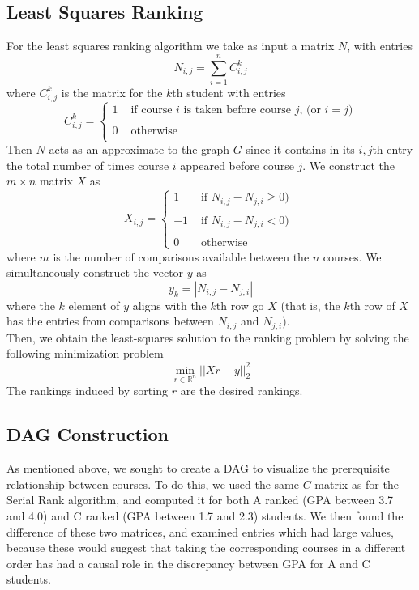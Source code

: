 \documentclass[10pt]{siamltex}
\begin{document}
\begin{pagewiselinenumbers}
\subsection{Least Squares Ranking}
For the least squares ranking algorithm we take as input a matrix $N$, with entries $$N_{i, j} = \sum_{i = 1}^n C^k_{i, j}$$
where $C^k_{i, j}$ is the matrix for the $k$th student with entries
\begin{equation}
C^k_{i,j} = \left\{
	\begin{array}{rl}
 1 & \text{ if course $i$ is taken before course $j$, (or $i=j$)} 	\\
 &  \\
 0 & \text{ otherwise }	\\
     \end{array}
   \right.
\label{comparisonMatrix}
\end{equation}
Then $N$ acts as an approximate to the graph $G$ since it contains in its $i, j$th entry the total number of times course $i$ appeared before course $j$. We construct the $m \times n$ matrix $X$ as
\begin{equation}
X_{i,j} = \left\{
	\begin{array}{rl}
 1 & \text{ if $N_{i, j} - N_{j, i} \geq 0$)} 	\\
 &  \\
 -1 & \text{ if $N_{i, j} - N_{j, i} < 0$) }	\\
& \\
0 & \text{ otherwise}
     \end{array}
   \right.
\label{comparisonMatrix}
\end{equation}
where $m$ is the number of comparisons available between the $n$ courses. We simultaneously construct the vector $y$ as 
$$y_k = \left|N_{i, j} - N_{j, i}\right|$$
where the $k$ element of $y$ aligns with the $k$th row go $X$ (that is, the $k$th row of $X$ has the entries from comparisons between $N_{i, j}$ and $N_{j, i})$.\\
Then, we obtain the least-squares solution to the ranking problem by solving the following minimization problem $$\min_{r \in \mathbb{R}^n} ||Xr - y||_2^2$$
The rankings induced by sorting $r$ are the desired rankings.
\subsection{DAG Construction}
As mentioned above, we sought to create a DAG to visualize the prerequisite relationship between courses. To do this, we used the same $C$ matrix as for the Serial Rank algorithm, and computed it for both A ranked (GPA between 3.7 and 4.0) and C ranked (GPA between 1.7 and 2.3) students. We then found the difference of these two matrices, and examined entries which had large values, because these would suggest that taking the corresponding courses in a different order has had a causal role in the discrepancy between GPA for A and C students.


\end{pagewiselinenumbers}
\end{document}
